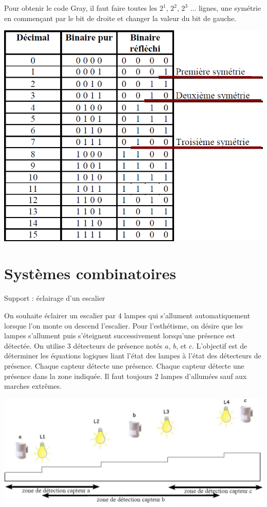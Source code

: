 \documentclass[11pt,oneside]{article}
\begin{document}
Pour obtenir le code Gray, il faut faire toutes les $2^1$, $2^2$, $2^3$ ... lignes, une symétrie en commençant par le bit de droite et changer la valeur du bit de gauche. 

\begin{center}
\includegraphics[width=.7\textwidth]{png/fig_05}
\end{center}



\section{Systèmes combinatoires}

\begin{exemple}
Support : éclairage d'un escalier

On souhaite éclairer un escalier par 4 lampes qui s'allument automatiquement lorsque l'on monte ou descend l'escalier. Pour l'esthétisme, on désire que les lampes s'allument puis s'éteignent successivement lorsqu'une présence est détectée. On utilise 3 détecteurs de présence notés $a$, $b$, et $c$. L'objectif est de déterminer les équations logiques liant l'état des lampes à l'état des détecteurs de présence. Chaque capteur détecte une présence. Chaque capteur détecte une présence dans la zone indiquée. Il faut toujours 2 lampes d'allumées sauf aux marches extrêmes. 
\end{exemple}


\begin{center}
\includegraphics[width=.9\textwidth]{png/fig_06}
\end{center}
\end{document}

